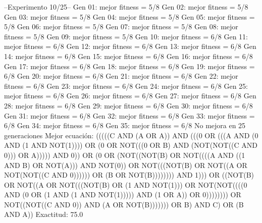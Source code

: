 --Experimento 
 10/25--
Gen 01: mejor fitness = 5/8
Gen 02: mejor fitness = 5/8
Gen 03: mejor fitness = 5/8
Gen 04: mejor fitness = 5/8
Gen 05: mejor fitness = 5/8
Gen 06: mejor fitness = 5/8
Gen 07: mejor fitness = 5/8
Gen 08: mejor fitness = 5/8
Gen 09: mejor fitness = 5/8
Gen 10: mejor fitness = 6/8
Gen 11: mejor fitness = 6/8
Gen 12: mejor fitness = 6/8
Gen 13: mejor fitness = 6/8
Gen 14: mejor fitness = 6/8
Gen 15: mejor fitness = 6/8
Gen 16: mejor fitness = 6/8
Gen 17: mejor fitness = 6/8
Gen 18: mejor fitness = 6/8
Gen 19: mejor fitness = 6/8
Gen 20: mejor fitness = 6/8
Gen 21: mejor fitness = 6/8
Gen 22: mejor fitness = 6/8
Gen 23: mejor fitness = 6/8
Gen 24: mejor fitness = 6/8
Gen 25: mejor fitness = 6/8
Gen 26: mejor fitness = 6/8
Gen 27: mejor fitness = 6/8
Gen 28: mejor fitness = 6/8
Gen 29: mejor fitness = 6/8
Gen 30: mejor fitness = 6/8
Gen 31: mejor fitness = 6/8
Gen 32: mejor fitness = 6/8
Gen 33: mejor fitness = 6/8
Gen 34: mejor fitness = 6/8
Gen 35: mejor fitness = 6/8
No mejora en 25 generaciones
Mejor ecuación: (((((C AND (A OR A)) AND (((0 OR (((A AND (0 AND (1 AND NOT(1)))) OR (0 OR NOT(((0 OR B) AND (NOT(NOT((C AND 0))) OR A))))) AND 0)) OR (0 OR (NOT((NOT(B) OR NOT((((A AND ((1 AND B) OR NOT(A))) AND NOT(0)) OR NOT(((NOT(B) OR NOT((A OR NOT(NOT((C AND 0)))))) OR (B OR NOT(B)))))))) AND 1))) OR ((NOT(B) OR NOT((A OR NOT(((NOT(B) OR (1 AND NOT(1))) OR NOT(NOT((((0 AND (0 OR (1 AND (1 AND NOT(1))))) AND (1 OR A)) OR 0)))))))) OR NOT((NOT((C AND 0)) AND (A OR NOT(B))))))) OR B) AND C) OR (B AND A))
 Exactitud: 75.0%

